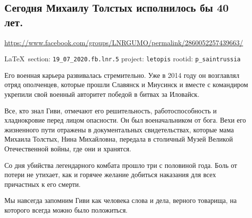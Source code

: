  
 

\subsection{Сегодня Михаилу Толстых исполнилось бы 40 лет.}
\url{https://www.facebook.com/groups/LNRGUMO/permalink/2860052257439663/}
  
\vspace{0.5cm}
{\small\LaTeX~section: \verb|19_07_2020.fb.lnr.5| project: \verb|letopis| rootid: \verb|p_saintrussia|}
\vspace{0.5cm}


Его военная карьера развивалась стремительно. Уже в 2014 году он возглавлял
отряд ополченцев, которые прошли Славянск и Миусинск и вместе с командиром
укрепили свой военный авторитет победой в битвах за Иловайск.

Все, кто знал Гиви, отмечают его решительность, работоспособность и
хладнокровие перед лицом опасности. Он был военачальником от бога. Вехи его
жизненного пути отражены в документальных свидетельствах, которые мама Михаила
Толстых, Нина Михайловна, передала в столичный Музей Великой Отечественной
войны, где они и хранятся.

Со дня убийства легендарного комбата прошло три с половиной года. Боль от
потери не утихает, как и горячее желание добиться наказания для всех причастных
к его смерти.

Мы навсегда запомним Гиви как человека слова и дела, верного товарища, на
которого всегда можно было положиться. 
